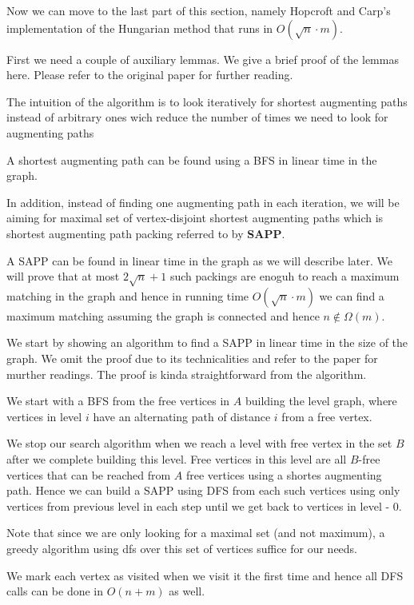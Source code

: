 Now we can move to the last part of this section, namely Hopcroft and Carp's implementation\cite{hopcroft1973n} of the Hungarian method that runs in $O(\sqrt n \cdot m)$.

First we need a couple of auxiliary lemmas. We give a brief proof of the lemmas here. Please refer to the original paper for further reading.

The intuition of the algorithm is to look iteratively for shortest augmenting paths instead of arbitrary ones wich reduce the number of times we need to look for augmenting paths

A shortest augmenting path can be found using a BFS in linear time in the graph.

In addition, instead of finding one augmenting path in each iteration, we will be aiming for maximal set of vertex-disjoint shortest augmenting paths which is shortest augmenting path packing referred to by \textbf{SAPP}.

A SAPP can be found in linear time in the graph as we will describe later. We will prove that at most $2\sqrt n + 1$ such packings are enoguh to reach a maximum matching in the graph and hence in running time $O(\sqrt n \cdot m)$ we can find a maximum matching assuming the graph is connected and hence $n \notin \Omega(m)$.

We start by showing an algorithm to find a SAPP in linear time in the size of the graph. We omit the proof due to its technicalities and refer to the paper for murther readings. The proof is kinda straightforward from the algorithm.

We start with a BFS from the free vertices in $A$ building the level graph, where vertices in level $i$ have an alternating path of distance $i$ from a free vertex.

We stop our search algorithm when we reach a level with free vertex in the set $B$ after we complete building this level. Free vertices in this level are all $B$-free vertices that can be reached from $A$ free vertices using a shortes augmenting path. Hence we can build a SAPP using DFS from each such vertices using only vertices from previous level in each step until we get back to vertices in level - 0.

Note that since we are only looking for a maximal set (and not maximum), a greedy algorithm using dfs over this set of vertices suffice for our needs.

We mark each vertex as visited when we visit it the first time and hence all DFS calls can be done in $O(n + m)$ as well. 

